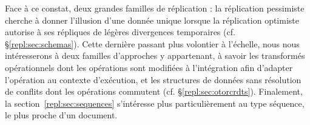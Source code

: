 Face à ce constat, deux grandes familles de réplication : la réplication
pessimiste cherche à donner l'illusion d'une donnée unique lorsque la
réplication optimiste autorise à ses répliques de légères divergences
temporaires (cf. §\ref{repl:sec:schemas}). Cette dernière passant plus volontier
à l'échelle, nous nous intéresserons à deux familles d'approches y appartenant,
à savoir les transformés opérationnels dont les opérations sont modifiées à
l'intégration afin d'adapter l'opération au contexte d'exécution, et les
structures de données sans résolution de conflits dont les opérations commutent
(cf. §\ref{repl:sec:otorcrdts}). Finalement, la section~\ref{repl:sec:sequences}
s'intéresse plus particulièrement au type séquence, le plus proche d'un
document.

